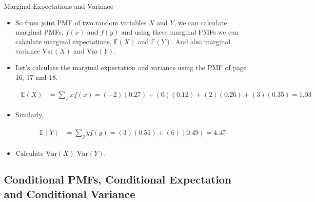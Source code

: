 \documentclass[8pt, usepdftitle = false]{beamer}
\begin{document}
\begin{frame}{Marginal Expectations and Variance}

\begin{itemize}
  \item So from joint PMF of two random variables $X$ and $Y$, we can calculate marginal PMFs, $f(x)$ and $f(y)$ and using these marginal PMFs we can calculate marginal expectations, $\mathbb{E}(X)$ and $\mathbb{E}(Y)$. And also marginal variance $\mathrm{Var}(X)$ and $\mathrm{Var}(Y)$.

  \item Let's calculate the marginal expectation and variance using the PMF of page $16$, $17$ and $18$.

  \begin{align*}
  \begin{aligned}
  \mathbb{E}(X) &=\sum_x x f(x) =(-2)(0.27)+(0)(0.12)+(2)(0.26)+(3)(0.35) =1.03\end{aligned}
  \end{align*}
  
  \item Similarly,
  

\begin{align*}
\begin{aligned}
\mathbb{E}(Y) &=\sum_y y f(y)=(3)(0.51)+(6)(0.49) =4.47
\end{aligned}
\end{align*}


\item Calculate $\mathrm{Var}(X)$ $\mathrm{Var}(Y)$.


\end{itemize}


\end{frame}





\subsection{Conditional PMFs, Conditional Expectation and Conditional Variance}
\end{document}
